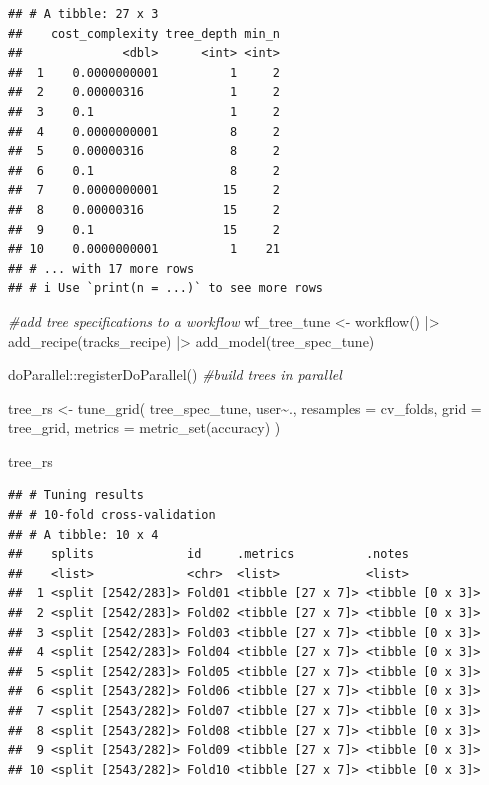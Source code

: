 \documentclass[
]{article}
\newenvironment{Shaded}{\begin{snugshade}}{\end{snugshade}}
\newcommand{\AttributeTok}[1]{\textcolor[rgb]{0.77,0.63,0.00}{#1}}
\newcommand{\CommentTok}[1]{\textcolor[rgb]{0.56,0.35,0.01}{\textit{#1}}}
\newcommand{\FunctionTok}[1]{\textcolor[rgb]{0.00,0.00,0.00}{#1}}
\newcommand{\NormalTok}[1]{#1}
\newcommand{\OtherTok}[1]{\textcolor[rgb]{0.56,0.35,0.01}{#1}}
\newcommand{\SpecialCharTok}[1]{\textcolor[rgb]{0.00,0.00,0.00}{#1}}
\begin{document}
\begin{verbatim}
## # A tibble: 27 x 3
##    cost_complexity tree_depth min_n
##              <dbl>      <int> <int>
##  1    0.0000000001          1     2
##  2    0.00000316            1     2
##  3    0.1                   1     2
##  4    0.0000000001          8     2
##  5    0.00000316            8     2
##  6    0.1                   8     2
##  7    0.0000000001         15     2
##  8    0.00000316           15     2
##  9    0.1                  15     2
## 10    0.0000000001          1    21
## # ... with 17 more rows
## # i Use `print(n = ...)` to see more rows
\end{verbatim}

\begin{Shaded}
\begin{Highlighting}[]
\CommentTok{\#add tree specifications to a workflow}
\NormalTok{wf\_tree\_tune }\OtherTok{\textless{}{-}} \FunctionTok{workflow}\NormalTok{() }\SpecialCharTok{|\textgreater{}} 
  \FunctionTok{add\_recipe}\NormalTok{(tracks\_recipe) }\SpecialCharTok{|\textgreater{}} 
  \FunctionTok{add\_model}\NormalTok{(tree\_spec\_tune)}


\NormalTok{doParallel}\SpecialCharTok{::}\FunctionTok{registerDoParallel}\NormalTok{() }\CommentTok{\#build trees in parallel}

\NormalTok{tree\_rs }\OtherTok{\textless{}{-}} \FunctionTok{tune\_grid}\NormalTok{(}
\NormalTok{  tree\_spec\_tune,}
\NormalTok{  user}\SpecialCharTok{\textasciitilde{}}\NormalTok{.,}
  \AttributeTok{resamples =}\NormalTok{ cv\_folds,}
  \AttributeTok{grid =}\NormalTok{ tree\_grid,}
  \AttributeTok{metrics =} \FunctionTok{metric\_set}\NormalTok{(accuracy)}
\NormalTok{)}

\NormalTok{tree\_rs}
\end{Highlighting}
\end{Shaded}

\begin{verbatim}
## # Tuning results
## # 10-fold cross-validation 
## # A tibble: 10 x 4
##    splits             id     .metrics          .notes          
##    <list>             <chr>  <list>            <list>          
##  1 <split [2542/283]> Fold01 <tibble [27 x 7]> <tibble [0 x 3]>
##  2 <split [2542/283]> Fold02 <tibble [27 x 7]> <tibble [0 x 3]>
##  3 <split [2542/283]> Fold03 <tibble [27 x 7]> <tibble [0 x 3]>
##  4 <split [2542/283]> Fold04 <tibble [27 x 7]> <tibble [0 x 3]>
##  5 <split [2542/283]> Fold05 <tibble [27 x 7]> <tibble [0 x 3]>
##  6 <split [2543/282]> Fold06 <tibble [27 x 7]> <tibble [0 x 3]>
##  7 <split [2543/282]> Fold07 <tibble [27 x 7]> <tibble [0 x 3]>
##  8 <split [2543/282]> Fold08 <tibble [27 x 7]> <tibble [0 x 3]>
##  9 <split [2543/282]> Fold09 <tibble [27 x 7]> <tibble [0 x 3]>
## 10 <split [2543/282]> Fold10 <tibble [27 x 7]> <tibble [0 x 3]>
\end{verbatim}
\end{document}
